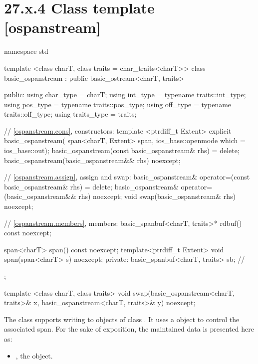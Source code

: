 \documentclass[ebook,11pt,article]{memoir}
\begin{document}
\section{27.x.4 Class template  [ospanstream] }

\begin{codeblock}
namespace std {
  template <class charT, class traits = char_traits<charT>>
  class basic_ospanstream
    : public basic_ostream<charT, traits> {
  public:
    using char_type      = charT;
    using int_type       = typename traits::int_type;
    using pos_type       = typename traits::pos_type;
    using off_type       = typename traits::off_type;
    using traits_type    = traits;

    // \ref{ospanstream.cons}, constructors:
    template <ptrdiff_t Extent>
    explicit basic_ospanstream(
      span<charT, Extent> span,
      ios_base::openmode which = ios_base::out);
    basic_ospanstream(const basic_ospanstream& rhs) = delete;
    basic_ospanstream(basic_ospanstream&& rhs) noexcept;

    // \ref{ospanstream.assign}, assign and swap:
    basic_ospanstream& operator=(const basic_ospanstream& rhs) = delete;
    basic_ospanstream& operator=(basic_ospanstream&& rhs) noexcept;
    void swap(basic_ospanstream& rhs) noexcept;

    // \ref{ospanstream.members}, members:
    basic_spanbuf<charT, traits>* rdbuf() const noexcept;

    span<charT> span() const noexcept;
	template<ptrdiff_t Extent>
    void span(span<charT> s) noexcept;
  private:
    basic_spanbuf<charT, traits> sb; // \expos
  };

  template <class charT, class traits>
    void swap(basic_ospanstream<charT, traits>& x,
              basic_ospanstream<charT, traits>& y) noexcept;
}
\end{codeblock}

\pnum
The class
supports writing to objects of class
.
It uses a
object to control the associated span.
For the sake of exposition, the maintained data is presented here as:
\begin{itemize}
\item
{}, the  object.
\end{itemize}

\end{document}
